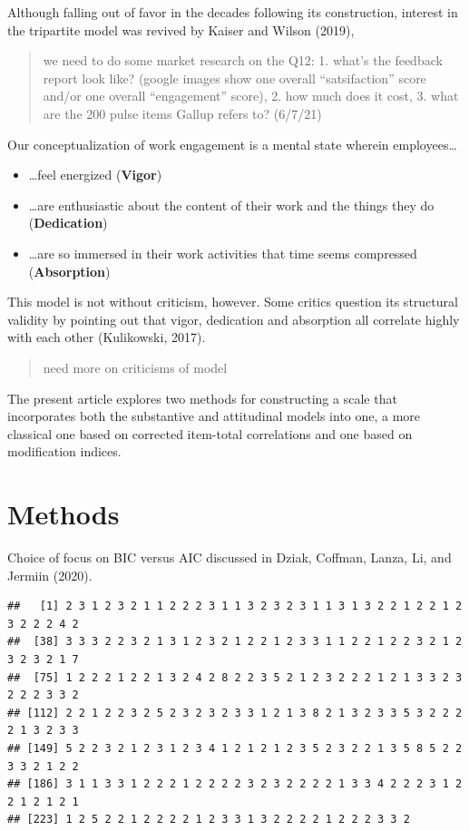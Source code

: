 \documentclass[
  english,
  man]{apa6}
\providecommand{\tightlist}{%
  \setlength{\itemsep}{0pt}\setlength{\parskip}{0pt}}
\begin{document}
Although falling out of favor in the decades following its construction, interest in the tripartite model was revived by Kaiser and Wilson (2019),

\begin{quote}
we need to do some market research on the Q12: 1. what's the feedback report look like? (google images show one overall \enquote{satsifaction} score and/or one overall \enquote{engagement} score), 2. how much does it cost, 3. what are the 200 pulse items Gallup refers to? (6/7/21)
\end{quote}

Our conceptualization of work engagement is a mental state wherein employees\ldots{}

\begin{itemize}
\tightlist
\item
  \ldots feel energized (\textbf{Vigor})
\item
  \ldots are enthusiastic about the content of their work and the things they do (\textbf{Dedication})
\item
  \ldots are so immersed in their work activities that time seems compressed (\textbf{Absorption})
\end{itemize}

This model is not without criticism, however. Some critics question its structural validity by pointing out that vigor, dedication and absorption all correlate highly with each other (Kulikowski, 2017).

\begin{quote}
need more on criticisms of model
\end{quote}

The present article explores two methods for constructing a scale that incorporates both the substantive and attitudinal models into one, a more classical one based on corrected item-total correlations and one based on modification indices.

\hypertarget{methods}{%
\section{Methods}\label{methods}}

Choice of focus on BIC versus AIC discussed in Dziak, Coffman, Lanza, Li, and Jermiin (2020).

\begin{verbatim}
##   [1] 2 3 1 2 3 2 1 1 2 2 2 3 1 1 3 2 3 2 3 1 1 3 1 3 2 2 1 2 2 1 2 3 2 2 2 4 2
##  [38] 3 3 3 2 2 3 2 1 3 1 2 3 2 1 2 2 1 2 3 3 1 1 2 2 1 2 2 3 2 1 2 3 2 3 2 1 7
##  [75] 1 2 2 2 1 2 2 1 3 2 4 2 8 2 2 3 5 2 1 2 3 2 2 2 1 2 1 3 3 2 3 2 2 2 3 3 2
## [112] 2 2 1 2 2 3 2 5 2 3 2 3 2 3 3 1 2 1 3 8 2 1 3 2 3 3 5 3 2 2 2 2 1 3 2 3 3
## [149] 5 2 2 3 2 1 2 3 1 2 3 4 1 2 1 2 1 2 3 5 2 3 2 2 1 3 5 8 5 2 2 3 3 2 1 2 2
## [186] 3 1 1 3 3 1 2 2 2 1 2 2 2 2 3 2 3 2 2 2 2 1 3 3 4 2 2 2 3 1 2 2 1 2 1 2 1
## [223] 1 2 5 2 2 1 2 2 2 2 1 2 3 3 1 3 2 2 2 2 1 2 2 2 3 3 2
\end{verbatim}
\end{document}
